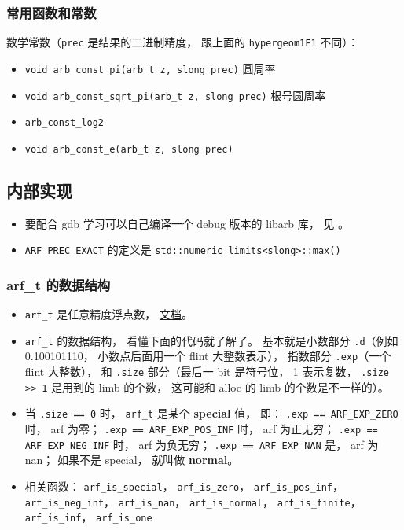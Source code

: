 \subsubsection{常用函数和常数}
数学常数（\verb|prec| 是结果的二进制精度， 跟上面的 \verb|hypergeom1F1| 不同）：
\begin{itemize}
\item \verb|void arb_const_pi(arb_t z, slong prec)| 圆周率
\item \verb|void arb_const_sqrt_pi(arb_t z, slong prec)| 根号圆周率
\item \verb|arb_const_log2|
\item \verb|void arb_const_e(arb_t z, slong prec)|
\end{itemize}


\subsection{内部实现}
\begin{itemize}
\item 要配合 gdb 学习可以自己编译一个 debug 版本的 libarb 库， 见 。
\item \verb|ARF_PREC_EXACT| 的定义是 \verb|std::numeric_limits<slong>::max()|
\end{itemize}

\subsubsection{arf\_t 的数据结构}
\begin{itemize}
\item \verb|arf_t| 是任意精度浮点数， \href{https://arblib.org/arf.html}{文档}。
\item \verb|arf_t| 的数据结构， 看懂下面的代码就了解了。 基本就是小数部分 \verb|.d|（例如 0.100101110， 小数点后面用一个 flint 大整数表示）， 指数部分 \verb|.exp|（一个 flint 大整数）， 和 \verb|.size| 部分（最后一 bit 是符号位， 1 表示复数， \verb|.size >> 1| 是用到的 limb 的个数， 这可能和 alloc 的 limb 的个数是不一样的）。
\item 当 \verb|.size == 0| 时， \verb|arf_t| 是某个 \textbf{special} 值， 即： \verb|.exp == ARF_EXP_ZERO| 时， arf 为零； \verb|.exp == ARF_EXP_POS_INF| 时， arf 为正无穷； \verb|.exp == ARF_EXP_NEG_INF| 时， arf 为负无穷； \verb|.exp == ARF_EXP_NAN| 是， arf 为 nan； 如果不是 special， 就叫做 \textbf{normal}。
\item 相关函数： \verb|arf_is_special|， \verb|arf_is_zero|， \verb|arf_is_pos_inf|， \verb|arf_is_neg_inf|， \verb|arf_is_nan|， \verb|arf_is_normal|， \verb|arf_is_finite|， \verb|arf_is_inf|， \verb|arf_is_one|
\end{itemize}

